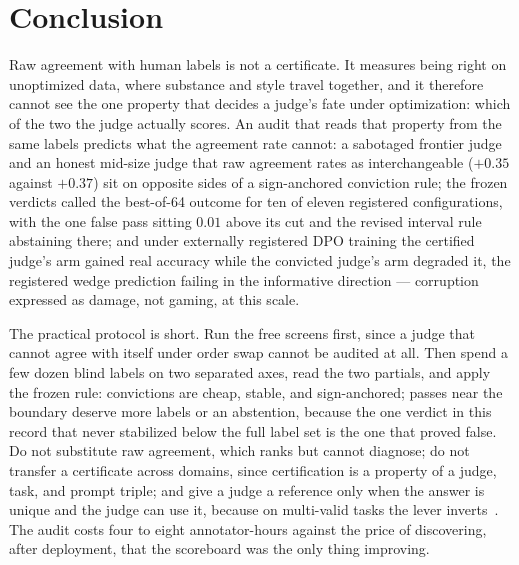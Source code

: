 \documentclass[11pt]{article}
\begin{document}
\section{Conclusion}

Raw agreement with human labels is not a certificate.
It measures being right on unoptimized data, where substance and style travel together, and it therefore cannot see the one property that decides a judge's fate under optimization: which of the two the judge actually scores.
An audit that reads that property from the same labels predicts what the agreement rate cannot: a sabotaged frontier judge and an honest mid-size judge that raw agreement rates as interchangeable ($+0.35$ against $+0.37$) sit on opposite sides of a sign-anchored conviction rule; the frozen verdicts called the best-of-64 outcome for ten of eleven registered configurations, with the one false pass sitting $0.01$ above its cut and the revised interval rule abstaining there; and under externally registered DPO training the certified judge's arm gained real accuracy while the convicted judge's arm degraded it, the registered wedge prediction failing in the informative direction --- corruption expressed as damage, not gaming, at this scale.

The practical protocol is short.
Run the free screens first, since a judge that cannot agree with itself under order swap cannot be audited at all.
Then spend a few dozen blind labels on two separated axes, read the two partials, and apply the frozen rule: convictions are cheap, stable, and sign-anchored; passes near the boundary deserve more labels or an abstention, because the one verdict in this record that never stabilized below the full label set is the one that proved false.
Do not substitute raw agreement, which ranks but cannot diagnose; do not transfer a certificate across domains, since certification is a property of a judge, task, and prompt triple; and give a judge a reference only when the answer is unique and the judge can use it, because on multi-valid tasks the lever inverts~\cite{companionD}.
The audit costs four to eight annotator-hours against the price of discovering, after deployment, that the scoreboard was the only thing improving.

\enlargethispage{4\baselineskip}
{\small


}
\end{document}
